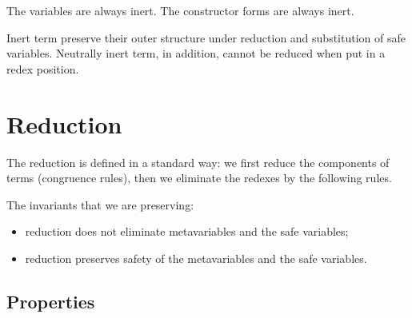 \documentclass[acmsmall,natbib=false,review,anonymous]{acmart}
\begin{document}
    \ottdefnOkOKFLabeled{}

    The variables are always inert.
    The constructor forms are always inert. 

    Inert term preserve their outer structure under reduction 
    and substitution of safe variables. 
    Neutrally inert term, in addition, cannot be reduced when
    put in a redex position.

    \ottdefnOkNeuInertLabeled{}
    \ottdefnOkInertLabeled{}
\newpage

\section{Reduction}
  \label{sec:red}
  
  The reduction is defined in a standard way:
  we first reduce the components of terms (congruence rules),
  then we eliminate the redexes by the following rules.
  \begin{ottdefnblock}[]{\ottdefnHeaderRedRed}{}
    \ottusedrule{\ottdruleRedRedAppLamLabeled[]{}}
    \ottusedrule{\ottdruleRedRedAppPLamLabeled[]{}}
    \ottusedrule{\ottdruleRedRedSubstRedLabeled[]{}}
  \end{ottdefnblock}

  The invariants that we are preserving:
  \begin{itemize}
    \item reduction does not eliminate metavariables and the safe variables;
    \item reduction preserves safety of the metavariables and the safe variables.
  \end{itemize}


\subsection{Properties}

\begin{lemma}
\end{lemma}

\begin{lemma}
\end{lemma}

\begin{lemma}
\end{lemma}
\end{document}
